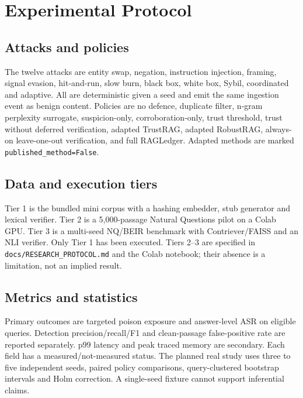 \documentclass[conference]{IEEEtran}
\begin{document}
\section{Experimental Protocol}
\subsection{Attacks and policies}
The twelve attacks are entity swap, negation, instruction injection, framing,
signal evasion, hit-and-run, slow burn, black box, white box, Sybil, coordinated
and adaptive. All are deterministic given a seed and emit the same ingestion
event as benign content. Policies are no defence, duplicate filter, n-gram
perplexity surrogate, suspicion-only, corroboration-only, trust threshold, trust
without deferred verification, adapted TrustRAG, adapted RobustRAG, always-on
leave-one-out verification, and full RAGLedger. Adapted methods are marked
\texttt{published\_method=False}.
\subsection{Data and execution tiers}
Tier 1 is the bundled mini corpus with a hashing embedder, stub generator and
lexical verifier. Tier 2 is a 5,000-passage Natural Questions pilot on a Colab
GPU. Tier 3 is a multi-seed NQ/BEIR benchmark with Contriever/FAISS and an NLI
verifier. Only Tier 1 has been executed. Tiers 2--3 are specified in
\texttt{docs/RESEARCH\_PROTOCOL.md} and the Colab notebook; their absence is a
limitation, not an implied result.
\subsection{Metrics and statistics}
Primary outcomes are targeted poison exposure and answer-level ASR on eligible
queries. Detection precision/recall/F1 and clean-passage false-positive rate are
reported separately. p99 latency and peak traced memory are secondary. Each
field has a measured/not-measured status. The planned real study uses three to
five independent seeds, paired policy comparisons, query-clustered bootstrap
intervals and Holm correction. A single-seed fixture cannot support inferential
claims.
\end{document}
